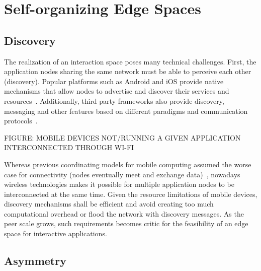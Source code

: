 \section{Self-organizing Edge Spaces}\label{sec:edge_spaces}

\subsection{Discovery}

The realization of an interaction space poses many technical challenges. First, the application nodes sharing the same network must be able to perceive each other (discovery). Popular platforms such as Android and iOS provide native mechanisms that allow nodes to advertise and discover their services and resources~\cite{ANDROID_NSD, IOS_Bonjour}. Additionally, third party frameworks also provide discovery, messaging and other features based on different paradigms and communication protocols~\cite{Alljoyn, IoTivity}. 

FIGURE: MOBILE DEVICES NOT/RUNNING A GIVEN APPLICATION INTERCONNECTED THROUGH WI-FI


Whereas previous coordinating models for mobile computing assumed the worse case for connectivity (nodes eventually meet and exchange data)~\cite{LIME, TUCSON, OTHERS}, nowadays wireless technologies makes it possible for multiple application nodes to be interconnected at the same time. Given the resource limitations of mobile devices, discovery mechanisms shall be efficient and avoid creating too much computational overhead or flood the network with discovery messages. As the peer scale grows, such requirements becomes critic for the feasibility of an edge space for interactive applications. 


\subsection{Asymmetry}


